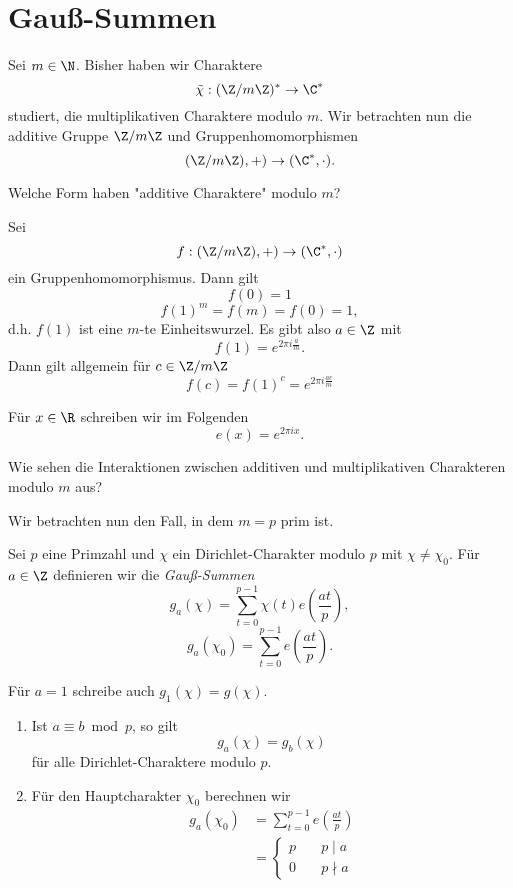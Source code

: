 \section{Gauß-Summen}

Sei $m \in \N$. Bisher haben wir Charaktere
\[ \tilde{\chi}: (\Z/m\Z)^* \to \C^* \]
studiert, die multiplikativen Charaktere modulo $m$. Wir betrachten nun die additive Gruppe $\Z/m\Z$ und  Gruppenhomomorphismen
\[ (\Z/m\Z),+) \to (\C^*,\cdot). \]

\begin{frage*}
	Welche Form haben "additive Charaktere" modulo $m$?
\end{frage*}

Sei 
\[ f: (\Z/m\Z),+) \to (\C^*,\cdot) \]
ein Gruppenhomomorphismus. Dann gilt
\[ f(0) = 1 \]
\[ f(1)^m = f(m) = f(0) = 1, \]
d.h. $f(1)$ ist eine $m$-te Einheitswurzel. Es gibt also $a \in \Z$ mit
\[ f(1) = e^{2\pi i \frac{a}{m}}. \]
Dann gilt allgemein für $c \in \Z/m\Z$
\[ f(c) = f(1)^c = e^{2\pi i \frac{ac}{m}} \]

\begin{notat*}
	Für $x \in \R$ schreiben wir im Folgenden
	\[ e(x) = e^{2\pi i x}. \]
\end{notat*}

\begin{frage*}
	Wie sehen die Interaktionen zwischen additiven und multiplikativen Charakteren modulo $m$ aus?
\end{frage*}

Wir betrachten nun den Fall, in dem $m=p$ prim ist.

\begin{defn*}
	Sei $p$ eine Primzahl und $\chi$ ein Dirichlet-Charakter modulo $p$ mit $\chi \neq \chi_0$. Für $a \in \Z$ definieren wir die \emph{Gauß-Summen}
	\[ g_a(\chi) = \sum_{t=0}^{p-1} \chi(t) e\left( \frac{at}{p} \right), \]
	\[ g_a(\chi_0) = \sum_{t=0}^{p-1} e\left( \frac{at}{p} \right). \]
\end{defn*}

\begin{notat*}
	Für $a=1$ schreibe auch $g_1(\chi) = g(\chi)$.
\end{notat*}

\begin{rem*}
	\begin{enumerate}[label={\roman*})]
		\item Ist $a \equiv b \bmod p$, so gilt
			\[ g_a(\chi) = g_b(\chi) \]
			für alle Dirichlet-Charaktere modulo $p$.
		\item Für den Hauptcharakter $\chi_0$ berechnen wir
			\begin{align*}
				g_a(\chi_0) &= \sum_{t=0}^{p-1} e\left( \frac{at}{p} \right)\\
				&= \begin{cases}
					p\quad &p \mid a\\
					0 &p \nmid a
				\end{cases}
			\end{align*}
	\end{enumerate}
\end{rem*}

